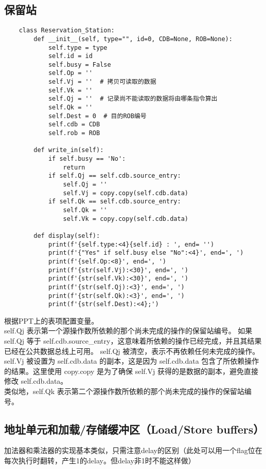 \documentclass{article}
\begin{document}
\subsection{保留站}
\begin{lstlisting}
    class Reservation_Station:
        def __init__(self, type="", id=0, CDB=None, ROB=None):
            self.type = type
            self.id = id
            self.busy = False
            self.Op = ''
            self.Vj = ''  # 拷贝可读取的数据
            self.Vk = ''
            self.Qj = ''  # 记录尚不能读取的数据将由哪条指令算出
            self.Qk = ''
            self.Dest = 0  # 目的ROB编号
            self.cdb = CDB
            self.rob = ROB

        def write_in(self):
            if self.busy == 'No':
                return
            if self.Qj == self.cdb.source_entry:
                self.Qj = ''
                self.Vj = copy.copy(self.cdb.data)
            if self.Qk == self.cdb.source_entry:
                self.Qk = ''
                self.Vk = copy.copy(self.cdb.data)

        def display(self):
            print(f'{self.type:<4}{self.id} : ', end= '')
            print(f'{"Yes" if self.busy else "No":<4}', end=', ')
            print(f'{self.Op:<8}', end=', ')
            print(f'{str(self.Vj):<30}', end=', ')
            print(f'{str(self.Vk):<30}', end=', ')
            print(f'{str(self.Qj):<3}', end=', ')
            print(f'{str(self.Qk):<3}', end=', ')
            print(f'{str(self.Dest):<4};')
\end{lstlisting}
根据PPT上的表项配置变量。\\
self.Qj 表示第一个源操作数所依赖的那个尚未完成的操作的保留站编号。
如果 self.Qj 等于 self.cdb.source\_entry，这意味着所依赖的操作已经完成，并且其结果已经在公共数据总线上可用。
self.Qj 被清空，表示不再依赖任何未完成的操作。\\
self.Vj 被设置为 self.cdb.data 的副本，这是因为 self.cdb.data 包含了所依赖操作的结果。这里使用 copy.copy 是为了确保 self.Vj 获得的是数据的副本，避免直接修改 self.cdb.data。
\\类似地，self.Qk 表示第二个源操作数所依赖的那个尚未完成的操作的保留站编号。




\subsection{地址单元和加载/存储缓冲区（Load/Store buffers）}
加法器和乘法器的实现基本类似，只需注意delay的区别（此处可以用一个flag位在每次执行时翻转，产生1的delay。但delay非1时不能这样做）
\end{document}
